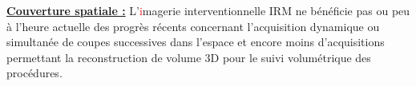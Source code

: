 \underline{\textbf{Couverture spatiale :}} L’\textcolor{red}{i}magerie interventionnelle IRM ne bénéficie pas ou peu à l’heure actuelle des progrès récents concernant l’acquisition dynamique ou simultanée de coupes successives dans l’espace et encore moins d’acquisitions permettant la reconstruction de volume 3D pour le suivi volumétrique des procédures.